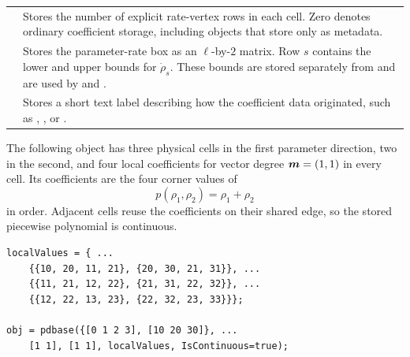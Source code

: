 \begin{tabularx}{\textwidth}{@{}p{}Y@{}}
     & Stores the number of explicit rate-vertex rows in each  cell. Zero denotes ordinary coefficient storage, including objects that store  only as metadata. \\
     & Stores the parameter-rate box as an $\ell$-by-$2$ matrix. Row $s$ contains the lower and upper bounds for $\dot{\rho}_s$. These bounds are stored separately from  and are used by  and . \\
     & Stores a short text label describing how the coefficient data originated, such as , , or . \\
    \bottomrule
\end{tabularx}

The following object has three physical cells in the first parameter direction, two in the second, and four local coefficients for vector degree $\boldsymbol{m}=(1,1)$ in every cell. Its coefficients are the four corner values of
$$p(\rho_1,\rho_2)=\rho_1+\rho_2$$
in  order. Adjacent cells reuse the coefficients on their shared edge, so the stored piecewise polynomial is continuous.

\begin{lstlisting}[style=dpmatlab]
localValues = { ...
    {{10, 20, 11, 21}, {20, 30, 21, 31}}, ...
    {{11, 21, 12, 22}, {21, 31, 22, 32}}, ...
    {{12, 22, 13, 23}, {22, 32, 23, 33}}};

obj = pdbase({[0 1 2 3], [10 20 30]}, ...
    [1 1], [1 1], localValues, IsContinuous=true);
\end{lstlisting}


